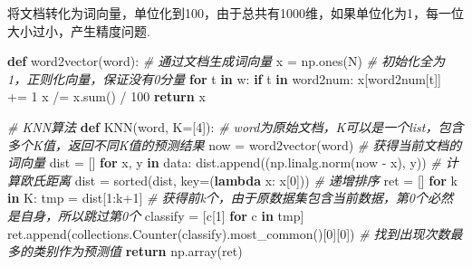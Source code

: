 \documentclass[
]{article}
\newenvironment{Shaded}{}{}
\newcommand{\BuiltInTok}[1]{#1}
\newcommand{\CommentTok}[1]{\textcolor[rgb]{0.38,0.63,0.69}{\textit{#1}}}
\newcommand{\ControlFlowTok}[1]{\textcolor[rgb]{0.00,0.44,0.13}{\textbf{#1}}}
\newcommand{\DecValTok}[1]{\textcolor[rgb]{0.25,0.63,0.44}{#1}}
\newcommand{\KeywordTok}[1]{\textcolor[rgb]{0.00,0.44,0.13}{\textbf{#1}}}
\newcommand{\NormalTok}[1]{#1}
\newcommand{\OperatorTok}[1]{\textcolor[rgb]{0.40,0.40,0.40}{#1}}
\begin{document}
将文档转化为词向量，单位化到100，由于总共有1000维，如果单位化为1，每一位大小过小，产生精度问题.

\begin{Shaded}
\begin{Highlighting}[]
\KeywordTok{def}\NormalTok{ word2vector(word):  }\CommentTok{\# 通过文档生成词向量}
\NormalTok{    x }\OperatorTok{=}\NormalTok{ np.ones(N)  }\CommentTok{\# 初始化全为1，正则化向量，保证没有0分量}
    \ControlFlowTok{for}\NormalTok{ t }\KeywordTok{in}\NormalTok{ w:}
        \ControlFlowTok{if}\NormalTok{ t }\KeywordTok{in}\NormalTok{ word2num:}
\NormalTok{            x[word2num[t]] }\OperatorTok{+=} \DecValTok{1}
\NormalTok{    x }\OperatorTok{/=}\NormalTok{ x.}\BuiltInTok{sum}\NormalTok{() }\OperatorTok{/} \DecValTok{100}
    \ControlFlowTok{return}\NormalTok{ x}
\end{Highlighting}
\end{Shaded}

\begin{Shaded}
\begin{Highlighting}[]
\CommentTok{\# KNN算法}
\KeywordTok{def}\NormalTok{ KNN(word, K}\OperatorTok{=}\NormalTok{[}\DecValTok{4}\NormalTok{]):  }\CommentTok{\# word为原始文档，K可以是一个list，包含多个K值，返回不同K值的预测结果}
\NormalTok{    now }\OperatorTok{=}\NormalTok{ word2vector(word)  }\CommentTok{\# 获得当前文档的词向量}
\NormalTok{    dist }\OperatorTok{=}\NormalTok{ []}
    \ControlFlowTok{for}\NormalTok{ x, y }\KeywordTok{in}\NormalTok{ data:}
\NormalTok{        dist.append((np.linalg.norm(now }\OperatorTok{{-}}\NormalTok{ x), y))  }\CommentTok{\# 计算欧氏距离}
\NormalTok{    dist }\OperatorTok{=} \BuiltInTok{sorted}\NormalTok{(dist, key}\OperatorTok{=}\NormalTok{(}\KeywordTok{lambda}\NormalTok{ x: x[}\DecValTok{0}\NormalTok{]))  }\CommentTok{\# 递增排序}
\NormalTok{    ret }\OperatorTok{=}\NormalTok{ []}
    \ControlFlowTok{for}\NormalTok{ k }\KeywordTok{in}\NormalTok{ K:}
\NormalTok{        tmp }\OperatorTok{=}\NormalTok{ dist[}\DecValTok{1}\NormalTok{:k}\OperatorTok{+}\DecValTok{1}\NormalTok{]  }\CommentTok{\# 获得前k个，由于原数据集包含当前数据，第0个必然是自身，所以跳过第0个}
\NormalTok{        classify }\OperatorTok{=}\NormalTok{ [c[}\DecValTok{1}\NormalTok{] }\ControlFlowTok{for}\NormalTok{ c }\KeywordTok{in}\NormalTok{ tmp]}
\NormalTok{        ret.append(collections.Counter(classify).most\_common()[}\DecValTok{0}\NormalTok{][}\DecValTok{0}\NormalTok{])  }\CommentTok{\# 找到出现次数最多的类别作为预测值}
    \ControlFlowTok{return}\NormalTok{ np.array(ret)}
\end{Highlighting}
\end{Shaded}
\end{document}
